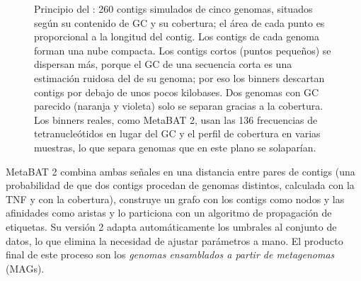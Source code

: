 \begin{figure}[t]
\centering
{}
\caption[Binning por composición y cobertura]{Principio del : 260 contigs simulados de cinco genomas, situados según su contenido de GC y su cobertura; el área de cada punto es proporcional a la longitud del contig. Los contigs de cada genoma forman una nube compacta. Los contigs cortos (puntos pequeños) se dispersan más, porque el GC de una secuencia corta es una estimación ruidosa del de su genoma; por eso los binners descartan contigs por debajo de unos pocos kilobases. Dos genomas con GC parecido (naranja y violeta) solo se separan gracias a la cobertura. Los binners reales, como MetaBAT 2, usan las 136 frecuencias de tetranucleótidos en lugar del GC y el perfil de cobertura en varias muestras, lo que separa genomas que en este plano se solaparían.}
\label{fig:14-binning}
\end{figure}

MetaBAT 2 \parencite{c14-kang2019} combina ambas señales en una distancia entre pares de contigs (una probabilidad de que dos contigs procedan de genomas distintos, calculada con la TNF y con la cobertura), construye un grafo con los contigs como nodos y las afinidades como aristas y lo particiona con un algoritmo de propagación de etiquetas. Su versión 2 adapta automáticamente los umbrales al conjunto de datos, lo que elimina la necesidad de ajustar parámetros a mano. El producto final de este proceso son los \emph{genomas ensamblados a partir de metagenomas} (MAGs).

